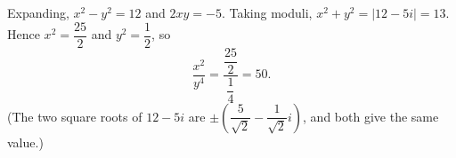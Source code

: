 Expanding, $x^2-y^2=12$ and $2xy=-5$. Taking moduli, $x^2+y^2=|12-5i|=13$. Hence $x^2=\dfrac{25}{2}$ and $y^2=\dfrac{1}{2}$, so
\[
\dfrac{x^2}{y^4}=\dfrac{\dfrac{25}{2}}{\dfrac{1}{4}}=\boxed{50}.
\]
(The two square roots of $12-5i$ are $\pm\left(\dfrac{5}{\sqrt2}-\dfrac{1}{\sqrt2}i\right)$, and both give the same value.)
